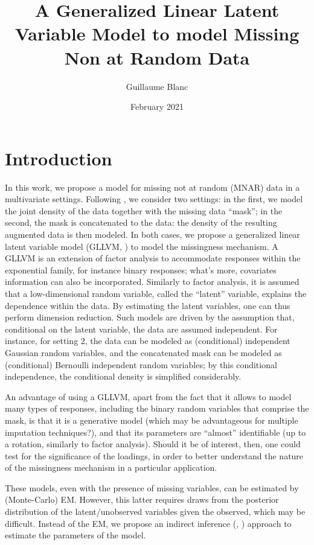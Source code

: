 \documentclass{article}
\title{A Generalized Linear Latent Variable Model to model Missing Non at Random Data}
\author{Guillaume Blanc}
\date{February 2021}
\begin{document}
\maketitle
\section{Introduction}
In this work, we propose a model for missing not at random (MNAR) data in a multivariate settings. Following \textcite{sportisse_imputation_2020}, we consider two settings: in the first, we model the joint density of the data together with the missing data ``mask''; in the second, the mask is concatenated to the data: the density of the resulting augmented data is then modeled. In both cases, we propose a generalized linear latent variable model (GLLVM, \cite{skrondal_generalized_2004}) to model the missingness mechanism. A GLLVM is an extension of factor analysis to accommodate responses within the exponential family, for instance binary responses; what's more, covariates information can also be incorporated. Similarly to factor analysis, it is assumed that a low-dimensional random variable, called the ``latent'' variable, explains the dependence within the data. By estimating the latent variables, one can thus perform dimension reduction. Such models are driven by the assumption that, conditional on the latent variable, the data are assumed independent. For instance, for setting 2, the data can be modeled as (conditional) independent Gaussian random variables, and the concatenated mask can be modeled as (conditional) Bernoulli independent random variables; by this conditional independence, the conditional density is simplified considerably.

An advantage of using a GLLVM, apart from the fact that it allows to model many types of responses, including the binary random variables that comprise the mask, is that it is a generative model (which may be advantageous for multiple imputation techniques?), and that its parameters are ``almost'' identifiable (up to a rotation, similarly to factor analysis). Should it be of interest, then, one could test for the significance of the loadings, in order to better understand the nature of the missingness mechanism in a particular application.

These models, even with the presence of missing variables, can be estimated by (Monte-Carlo) EM. However, this latter requires draws from the posterior distribution of the latent/unobserved variables given the observed, which may be difficult. Instead of the EM, we propose an indirect inference (\cite{gourieroux_indirect_1993}, \cite{gallant_which_1996}) approach to estimate the parameters of the model.
\end{document}
